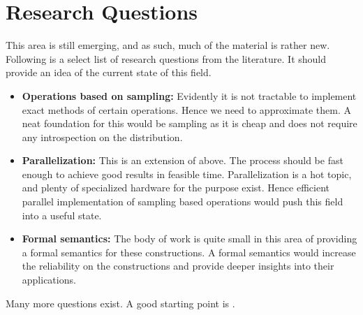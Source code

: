 \section{Research Questions}
This area is still emerging, and as such, much of the material is rather new.
Following is a select list of research questions from the literature. It
should provide an idea of the current state of this field.

\begin{itemize}
    \item \textbf{Operations based on sampling:} Evidently it is not tractable
      to implement exact methods of certain operations. Hence we need to
      approximate them. A neat foundation for this would be sampling as it is
      cheap and does not require any introspection on the distribution.
    \item \textbf{Parallelization:} This is an extension of above. The process
      should be fast enough to achieve good results in feasible time.
      Parallelization is a hot topic, and plenty of specialized hardware for the
      purpose exist. Hence efficient parallel implementation of sampling based
      operations would push this field into a useful state.
    \item \textbf{Formal semantics:} The body of work is quite small in this area of
      providing a formal semantics for these constructions. A formal semantics
      would increase the reliability on the constructions and provide deeper
      insights into their applications.
\end{itemize}

Many more questions exist. A good starting point is \cite{Scibior:2015}.
